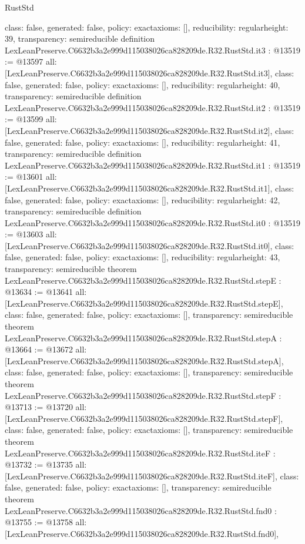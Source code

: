 \begin{lexlean}{RustStd}
\begin{coremodule}
{  class: false,
  generated: false,
  policy: exact{axioms: []},
  reducibility: regular{height: 39},
  transparency: semireducible
}
definition LexLeanPreserve.C6632b3a2e999d115038026ca828209de.R32.RustStd.it3 : @13519 := @13597 {
  all: [LexLeanPreserve.C6632b3a2e999d115038026ca828209de.R32.RustStd.it3],
  class: false,
  generated: false,
  policy: exact{axioms: []},
  reducibility: regular{height: 40},
  transparency: semireducible
}
definition LexLeanPreserve.C6632b3a2e999d115038026ca828209de.R32.RustStd.it2 : @13519 := @13599 {
  all: [LexLeanPreserve.C6632b3a2e999d115038026ca828209de.R32.RustStd.it2],
  class: false,
  generated: false,
  policy: exact{axioms: []},
  reducibility: regular{height: 41},
  transparency: semireducible
}
definition LexLeanPreserve.C6632b3a2e999d115038026ca828209de.R32.RustStd.it1 : @13519 := @13601 {
  all: [LexLeanPreserve.C6632b3a2e999d115038026ca828209de.R32.RustStd.it1],
  class: false,
  generated: false,
  policy: exact{axioms: []},
  reducibility: regular{height: 42},
  transparency: semireducible
}
definition LexLeanPreserve.C6632b3a2e999d115038026ca828209de.R32.RustStd.it0 : @13519 := @13603 {
  all: [LexLeanPreserve.C6632b3a2e999d115038026ca828209de.R32.RustStd.it0],
  class: false,
  generated: false,
  policy: exact{axioms: []},
  reducibility: regular{height: 43},
  transparency: semireducible
}
theorem LexLeanPreserve.C6632b3a2e999d115038026ca828209de.R32.RustStd.stepE : @13634 := @13641 {
  all: [LexLeanPreserve.C6632b3a2e999d115038026ca828209de.R32.RustStd.stepE],
  class: false,
  generated: false,
  policy: exact{axioms: []},
  transparency: semireducible
}
theorem LexLeanPreserve.C6632b3a2e999d115038026ca828209de.R32.RustStd.stepA : @13664 := @13672 {
  all: [LexLeanPreserve.C6632b3a2e999d115038026ca828209de.R32.RustStd.stepA],
  class: false,
  generated: false,
  policy: exact{axioms: []},
  transparency: semireducible
}
theorem LexLeanPreserve.C6632b3a2e999d115038026ca828209de.R32.RustStd.stepF : @13713 := @13720 {
  all: [LexLeanPreserve.C6632b3a2e999d115038026ca828209de.R32.RustStd.stepF],
  class: false,
  generated: false,
  policy: exact{axioms: []},
  transparency: semireducible
}
theorem LexLeanPreserve.C6632b3a2e999d115038026ca828209de.R32.RustStd.iteF : @13732 := @13735 {
  all: [LexLeanPreserve.C6632b3a2e999d115038026ca828209de.R32.RustStd.iteF],
  class: false,
  generated: false,
  policy: exact{axioms: []},
  transparency: semireducible
}
theorem LexLeanPreserve.C6632b3a2e999d115038026ca828209de.R32.RustStd.fnd0 : @13755 := @13758 {
  all: [LexLeanPreserve.C6632b3a2e999d115038026ca828209de.R32.RustStd.fnd0],
}
\end{coremodule}
\end{lexlean}
